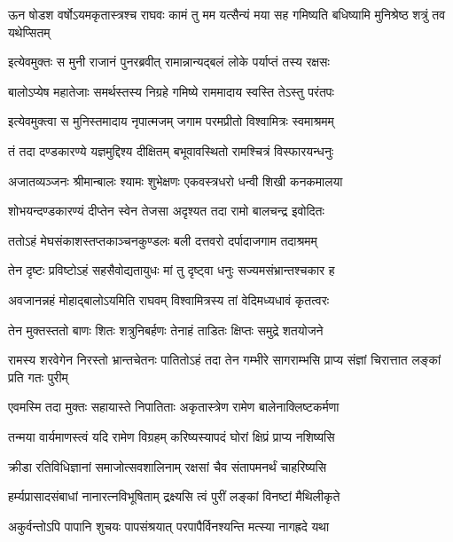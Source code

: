 \threelineshloka
{ऊन षोडश वर्षोऽयमकृतास्त्रश्च राघवः}
{कामं तु मम यत्सैन्यं मया सह गमिष्यति}
{बधिष्यामि मुनिश्रेष्ठ शत्रुं तव यथेप्सितम्} %

\twolineshloka
{इत्येवमुक्तः स मुनी राजानं पुनरब्रवीत्}
{रामान्नान्यद्बलं लोके पर्याप्तं तस्य रक्षसः} %

\twolineshloka
{बालोऽप्येष महातेजाः समर्थस्तस्य निग्रहे}
{गमिष्ये राममादाय स्वस्ति तेऽस्तु परंतपः} %

\twolineshloka
{इत्येवमुक्त्वा स मुनिस्तमादाय नृपात्मजम्}
{जगाम परमप्रीतो विश्वामित्रः स्वमाश्रमम्} %

\twolineshloka
{तं तदा दण्डकारण्ये यज्ञमुद्दिश्य दीक्षितम्}
{बभूवावस्थितो रामश्चित्रं विस्फारयन्धनुः} %

\twolineshloka
{अजातव्यञ्जनः श्रीमान्बालः श्यामः शुभेक्षणः}
{एकवस्त्रधरो धन्वी शिखी कनकमालया} %

\twolineshloka
{शोभयन्दण्डकारण्यं दीप्तेन स्वेन तेजसा}
{अदृश्यत तदा रामो बालचन्द्र इवोदितः} %

\twolineshloka
{ततोऽहं मेघसंकाशस्तप्तकाञ्चनकुण्डलः}
{बली दत्तवरो दर्पादाजगाम तदाश्रमम्} %

\twolineshloka
{तेन दृष्टः प्रविष्टोऽहं सहसैवोद्यतायुधः}
{मां तु दृष्ट्वा धनुः सज्यमसंभ्रान्तश्चकार ह} %

\twolineshloka
{अवजानन्नहं मोहाद्बालोऽयमिति राघवम्}
{विश्वामित्रस्य तां वेदिमध्यधावं कृतत्वरः} %

\twolineshloka
{तेन मुक्तस्ततो बाणः शितः शत्रुनिबर्हणः}
{तेनाहं ताडितः क्षिप्तः समुद्रे शतयोजने} %

\threelineshloka
{रामस्य शरवेगेन निरस्तो भ्रान्तचेतनः}
{पातितोऽहं तदा तेन गम्भीरे सागराम्भसि}
{प्राप्य संज्ञां चिरात्तात लङ्कां प्रति गतः पुरीम्} %

\twolineshloka
{एवमस्मि तदा मुक्तः सहायास्ते निपातिताः}
{अकृतास्त्रेण रामेण बालेनाक्लिष्टकर्मणा} %

\twolineshloka
{तन्मया वार्यमाणस्त्वं यदि रामेण विग्रहम्}
{करिष्यस्यापदं घोरां क्षिप्रं प्राप्य नशिष्यसि} %

\twolineshloka
{क्रीडा रतिविधिज्ञानां समाजोत्सवशालिनाम्}
{रक्षसां चैव संतापमनर्थं चाहरिष्यसि} %

\twolineshloka
{हर्म्यप्रासादसंबाधां नानारत्नविभूषिताम्}
{द्रक्ष्यसि त्वं पुरीं लङ्कां विनष्टां मैथिलीकृते} %

\twolineshloka
{अकुर्वन्तोऽपि पापानि शुचयः पापसंश्रयात्}
{परपापैर्विनश्यन्ति मत्स्या नागह्रदे यथा} %

